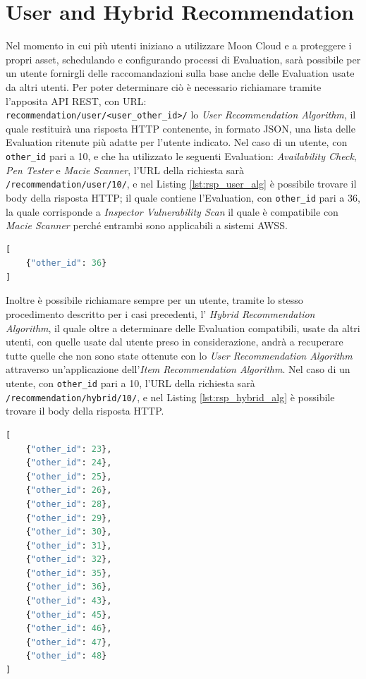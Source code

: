 \section*{User and Hybrid Recommendation}
Nel momento in cui più utenti iniziano a utilizzare Moon Cloud e a proteggere i propri asset, schedulando e configurando 
processi di Evaluation, sarà possibile per un utente fornirgli delle raccomandazioni sulla base anche delle Evaluation usate da 
altri utenti. Per poter determinare ciò è necessario richiamare tramite l'apposita API REST, con URL: \\
\texttt{recommendation/user/<user\_other\_id>/} lo \textit{User Recommendation Algorithm}, il quale restituirà una 
risposta HTTP contenente, in formato JSON, una lista delle Evaluation ritenute più adatte per l'utente indicato. 
Nel caso di un utente, con \texttt{other\_id} pari a 10, e che ha utilizzato le seguenti Evaluation: \textit{Availability Check},
\textit{Pen Tester} e \textit{Macie Scanner}, l'URL della richiesta sarà 
\texttt{/recommendation/user/10/}, e nel Listing \ref{lst:rsp_user_alg} è possibile trovare il body della risposta HTTP; il quale 
contiene l'Evaluation, con \texttt{other\_id} pari a 36, la quale corrisponde a \textit{Inspector Vulnerability Scan} il quale 
è compatibile con \textit{Macie Scanner} perché entrambi sono applicabili a sistemi AWSS.
\begin{lstlisting}[language=Python, label=lst:rsp_user_alg, caption={Esempio di risposta HTTP alla chiamata del 
    \textit{User Recommendation Algorithm}}]
[
    {"other_id": 36}
]
\end{lstlisting}
Inoltre è possibile richiamare sempre per un utente, tramite lo stesso procedimento descritto per i casi precedenti, 
l' \textit{Hybrid Recommendation Algorithm}, il quale oltre a determinare delle Evaluation compatibili, usate da altri 
utenti, con quelle usate dal utente preso in considerazione, andrà a recuperare tutte quelle che non sono state ottenute con lo
\textit{User Recommendation Algorithm} attraverso un'applicazione dell'\textit{Item Recommendation Algorithm}. Nel caso di 
un utente, con \texttt{other\_id} pari a 10, l'URL della richiesta sarà 
\texttt{/recommendation/hybrid/10/}, e nel Listing \ref{lst:rsp_hybrid_alg} è possibile trovare il body della risposta HTTP.
\begin{lstlisting}[language=Python, label=lst:rsp_hybrid_alg, caption={Esempio di risposta HTTP alla chiamata del 
    \textit{Hybrid Recommendation Algorithm}}]
[
    {"other_id": 23},
    {"other_id": 24},
    {"other_id": 25},
    {"other_id": 26},
    {"other_id": 28},
    {"other_id": 29},
    {"other_id": 30},
    {"other_id": 31},
    {"other_id": 32},
    {"other_id": 35},
    {"other_id": 36},
    {"other_id": 43},
    {"other_id": 45},
    {"other_id": 46},
    {"other_id": 47},
    {"other_id": 48}
]
\end{lstlisting}
